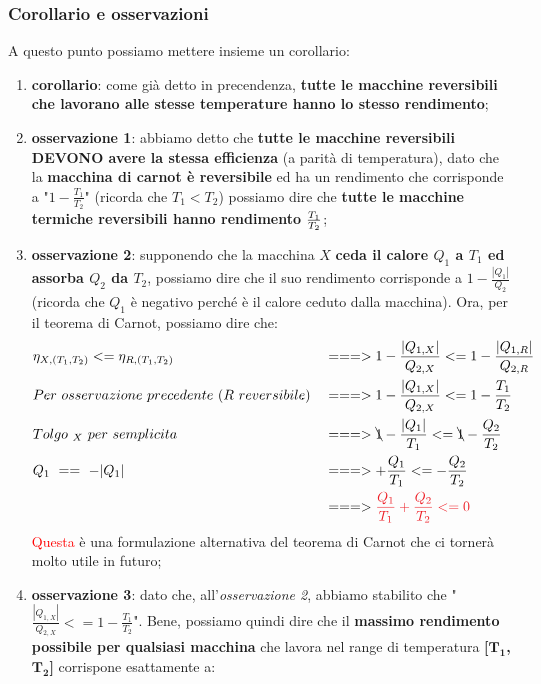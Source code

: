             \subsubsection{Corollario e osservazioni}
                A questo punto possiamo mettere insieme un corollario:
                \begin{enumerate}
                    \item \textbf{corollario}: come già detto in precendenza, \textbf{tutte le macchine reversibili che lavorano alle stesse temperature hanno lo stesso rendimento};
                    \item \textbf{osservazione 1}: abbiamo detto che \textbf{tutte le macchine reversibili DEVONO avere la stessa efficienza} (a parità di temperatura), dato che la \textbf{macchina di carnot è reversibile} ed ha un rendimento che corrisponde a "$1-\frac{T_1}{T_2}$" (ricorda che $T_1<T_2$) possiamo dire che \textbf{tutte le macchine termiche reversibili hanno rendimento \textcolor{Red}{$\-\frac{T_1}{T_2}$}};
                    \item \textbf{osservazione 2}: supponendo che la macchina $X$ \textbf{ceda il calore $Q_1$ a $T_1$ ed assorba $Q_2$ da $T_2$}, possiamo dire che il suo rendimento corrisponde a $1-\frac{|Q_1|}{Q_2}$ (ricorda che $Q_1$ è negativo perché è il calore ceduto dalla macchina). Ora, per il teorema di Carnot, possiamo dire che:
                    \begin{align*}
                        &\eta_{X, (T_1, T_2)} <= \eta_{R, (T_1, T_2)}&&===>1-\frac{|Q_{1, X}|}{Q_{2, X}} <= 1-\frac{|Q_{1, R}|}{Q_{2, R}}\\
                        & Per\ osservazione\ precedente\ (R\ reversibile) &&===>1-\frac{|Q_{1, X}|}{Q_{2, X}} <= 1-\frac{T_1}{T_2}\\
                        & Tolgo\ _X\ per\ semplicita && ===>\bcancel{1}-\frac{|Q_1|}{T_1} <= \bcancel{1}-\frac{Q_2}{T_2}\\
                        & Q_1\ ==\ -|Q_1|&& ===>+\frac{Q_1}{T_1} <= -\frac{Q_2}{T_2}\\
                        & && ===>\textcolor{Red}{\frac{Q_1}{T_1}+ \frac{Q_2}{T_2} <= 0}\\
                    \end{align*}
                    \textcolor{Red}{Questa} è una formulazione alternativa del teorema di Carnot che ci tornerà molto utile in futuro;
                    \item \textbf{osservazione 3}: dato che, all'\textit{osservazione 2}, abbiamo stabilito che "$\frac{|Q_{1, X}|}{Q_{2, X}} <= 1-\frac{T_1}{T_2}$". Bene, possiamo quindi dire che il \textbf{massimo rendimento possibile per qualsiasi macchina} che lavora nel range di temperatura \textbf{[$\mathbf{T_1}$, $\mathbf{T_2}$]} corrispone esattamente a:

\end{enumerate}
